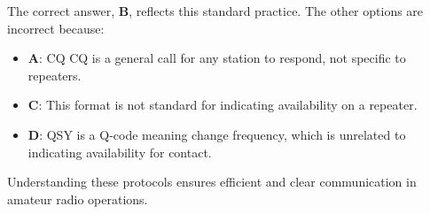 The correct answer, \textbf{B}, reflects this standard practice. The other options are incorrect because:
\begin{itemize}
    \item \textbf{A}: CQ CQ is a general call for any station to respond, not specific to repeaters.
    \item \textbf{C}: This format is not standard for indicating availability on a repeater.
    \item \textbf{D}: QSY is a Q-code meaning change frequency, which is unrelated to indicating availability for contact.
\end{itemize}

Understanding these protocols ensures efficient and clear communication in amateur radio operations.

